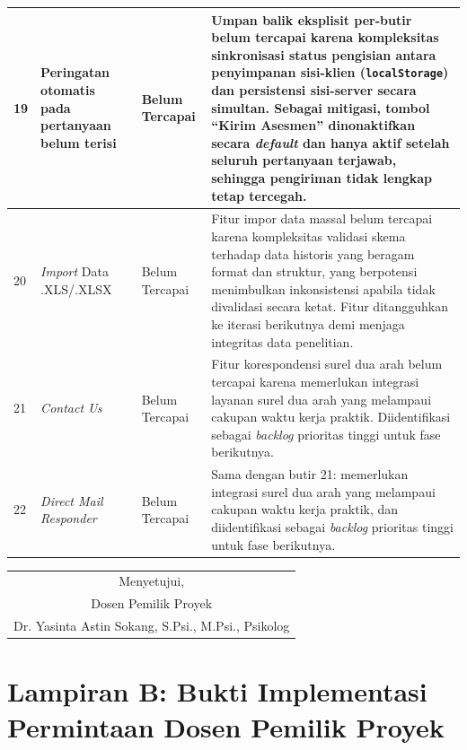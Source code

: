 {\begin{longtable}{|p{0.6cm}|p{4.0cm}|p{1.8cm}|p{5.8cm}|}
  19 & Peringatan otomatis pada pertanyaan belum terisi & Belum Tercapai & Umpan balik eksplisit per-butir belum tercapai karena kompleksitas sinkronisasi status pengisian antara penyimpanan sisi-klien (\texttt{localStorage}) dan persistensi sisi-server secara simultan. Sebagai mitigasi, tombol ``Kirim Asesmen'' dinonaktifkan secara \textit{default} dan hanya aktif setelah seluruh pertanyaan terjawab, sehingga pengiriman tidak lengkap tetap tercegah. \\
  \hline
  20 & \textit{Import} Data .XLS/.XLSX & Belum Tercapai & Fitur impor data massal belum tercapai karena kompleksitas validasi skema terhadap data historis yang beragam format dan struktur, yang berpotensi menimbulkan inkonsistensi apabila tidak divalidasi secara ketat. Fitur ditangguhkan ke iterasi berikutnya demi menjaga integritas data penelitian. \\
  \hline
  21 & \textit{Contact Us} & Belum Tercapai & Fitur korespondensi surel dua arah belum tercapai karena memerlukan integrasi layanan surel dua arah yang melampaui cakupan waktu kerja praktik. Diidentifikasi sebagai \textit{backlog} prioritas tinggi untuk fase berikutnya. \\
  \hline
  22 & \textit{Direct Mail Responder} & Belum Tercapai & Sama dengan butir 21: memerlukan integrasi surel dua arah yang melampaui cakupan waktu kerja praktik, dan diidentifikasi sebagai \textit{backlog} prioritas tinggi untuk fase berikutnya. \\
  \hline

\end{longtable}
}

\vspace{1cm}
\begin{flushright}
\begin{tabular}{c}
Menyetujui, \\
Dosen Pemilik Proyek \\[2.5cm]
Dr. Yasinta Astin Sokang, S.Psi., M.Psi., Psikolog \\
\end{tabular}
\end{flushright}

\clearpage

\section*{Lampiran B: Bukti Implementasi Permintaan Dosen Pemilik Proyek}
\label{lamp:bukti-implementasi}
\setcounter{figure}{0}
\renewcommand{\thefigure}{B.\arabic{figure}}

